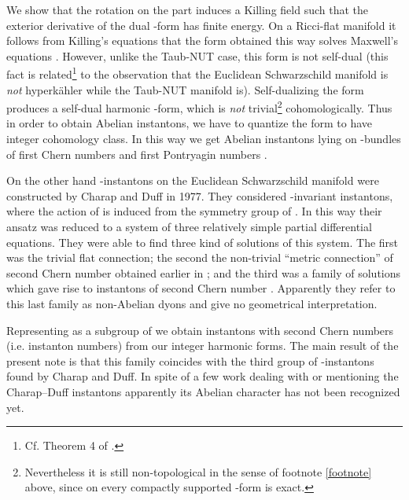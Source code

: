 \documentclass[a4paper,12pt,draft]{article}
\begin{document}
We show that the rotation on the \coordHE{} part 
induces a Killing field such that the exterior derivative of the dual 
\coordHE{}-form has finite energy. On a Ricci-flat manifold it follows from 
Killing's equations that the form obtained this way solves Maxwell's 
equations \cite{wald}. 
However, unlike the Taub-NUT case, this form is not self-dual (this fact
is related\footnote{Cf. Theorem 4 of \cite{hitchin}.} 
to the observation that the Euclidean Schwarzschild manifold is 
{\it not} hyperk\"ahler while the Taub-NUT manifold is). Self-dualizing
the form produces a self-dual \coordHE{} harmonic \coordHE{}-form, which is {\em not}
trivial\footnote{Nevertheless it is still non-topological in the sense of  
 footnote \ref{footnote} above, since on \coordHE{} every compactly supported 
\coordHE{}-form is exact.} 
 cohomologically. Thus in order to obtain Abelian instantons, we
have to quantize the form to have integer cohomology class. In this way we 
get   
Abelian instantons lying on \coordHE{}-bundles of first Chern numbers \coordHE{} and 
first Pontryagin numbers \coordHE{}. 

On the other hand \coordHE{}-instantons on the Euclidean Schwarzschild
manifold were 
constructed by Charap and Duff \cite{charap-duff} in 1977. They considered 
\coordHE{}-invariant instantons, where the action of \coordHE{} is induced from the 
symmetry group of \coordHE{}. In this way their ansatz was reduced to a system of 
three relatively simple partial differential equations. They were able to 
find
three kind of solutions of this system. The first was the trivial flat 
connection; the second the non-trivial ``metric connection'' of second
Chern number  \coordHE{} obtained earlier in \cite{charap-duff1}; and the third 
was a family of  solutions which gave rise to instantons of second Chern
number \coordHE{}. Apparently they refer to this last family as non-Abelian
dyons and give no geometrical interpretation.   

Representing \coordHE{} as a subgroup of \coordHE{} we obtain \coordHE{} instantons 
with second Chern numbers (i.e. instanton numbers) \coordHE{} from our integer
\coordHE{} harmonic forms. The  main result of the present note is that this
family coincides with the third group of \coordHE{}-instantons found by Charap 
and Duff.  In spite of a few work dealing with or mentioning the
Charap--Duff instantons \cite{gibi}\cite{pope1}\cite{pope2} apparently its
Abelian character has not been recognized yet.
\end{document}
